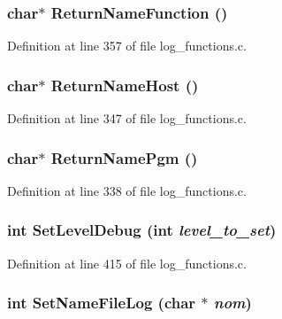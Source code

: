 \subsubsection[{ReturnNameFunction}]{\setlength{\rightskip}{0pt plus 5cm}char$\ast$ ReturnNameFunction ()}\label{log__functions_8c_546cc865726cc916d689b34282e48733}




Definition at line 357 of file log\_\-functions.c.
\subsubsection[{ReturnNameHost}]{\setlength{\rightskip}{0pt plus 5cm}char$\ast$ ReturnNameHost ()}\label{log__functions_8c_4b309303417dda2a88696af4e099487c}




Definition at line 347 of file log\_\-functions.c.
\subsubsection[{ReturnNamePgm}]{\setlength{\rightskip}{0pt plus 5cm}char$\ast$ ReturnNamePgm ()}\label{log__functions_8c_d66cd61e5089f3c9d219b7c0af205f0c}




Definition at line 338 of file log\_\-functions.c.
\subsubsection[{SetLevelDebug}]{\setlength{\rightskip}{0pt plus 5cm}int SetLevelDebug (int {\em level\_\-to\_\-set})}\label{log__functions_8c_f05e684b94550fe4539d4a22a6475e7e}




Definition at line 415 of file log\_\-functions.c.
\subsubsection[{SetNameFileLog}]{\setlength{\rightskip}{0pt plus 5cm}int SetNameFileLog (char $\ast$ {\em nom})}\label{log__functions_8c_71693baf2fa129bf27ed975386fe8a0e}




